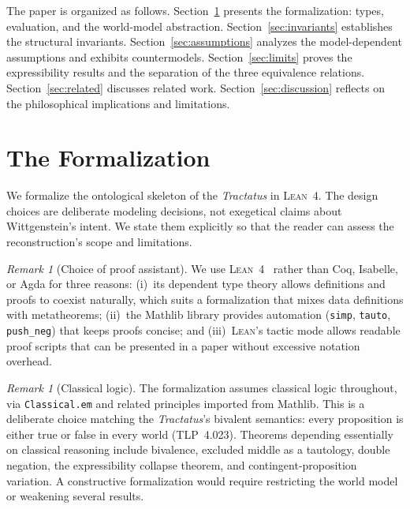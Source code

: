 \documentclass[10pt, letterpaper]{article}
\theoremstyle{definition}
\theoremstyle{remark}
\newtheorem{remark}[theorem]{Remark}
\newcommand{\Lean}{\textsc{Lean}}
\begin{document}
The paper is organized as follows.
Section~\ref{sec:formalization} presents the formalization:
types, evaluation, and the world-model abstraction.
Section~\ref{sec:invariants} establishes the structural
invariants.
Section~\ref{sec:assumptions} analyzes the model-dependent
assumptions and exhibits countermodels.
Section~\ref{sec:limits} proves the expressibility results and
the separation of the three equivalence relations.
Section~\ref{sec:related} discusses related work.
Section~\ref{sec:discussion} reflects on the philosophical
implications and limitations.

\section{The Formalization}
\label{sec:formalization}

We formalize the ontological skeleton of the \emph{Tractatus}
in \Lean~4.  The design choices are deliberate modeling
decisions, not exegetical claims about Wittgenstein's intent.
We state them explicitly so that the reader can assess the
reconstruction's scope and limitations.

\begin{remark}[Choice of proof assistant]
\label{rem:lean4}
We use \Lean~4~\cite{moura2021} rather than Coq, Isabelle, or
Agda for three reasons: (i)~its dependent type theory allows
definitions and proofs to coexist naturally, which suits a
formalization that mixes data definitions with metatheorems;
(ii)~the Mathlib library provides automation
(\texttt{simp}, \texttt{tauto}, \texttt{push\_neg}) that keeps
proofs concise; and (iii)~\Lean's tactic mode allows readable
proof scripts that can be presented in a paper without excessive
notation overhead.
\end{remark}

\begin{remark}[Classical logic]
\label{rem:classical}
The formalization assumes classical logic throughout, via
\texttt{Classical.em} and related principles imported from
Mathlib.  This is a deliberate choice matching the
\emph{Tractatus}'s bivalent semantics: every proposition is
either true or false in every world (TLP~4.023).
Theorems depending essentially on classical reasoning include
bivalence, excluded middle as a tautology, double negation,
the expressibility collapse theorem, and contingent-proposition
variation.  A constructive formalization would require
restricting the world model or weakening several results.
\end{remark}
\end{document}
